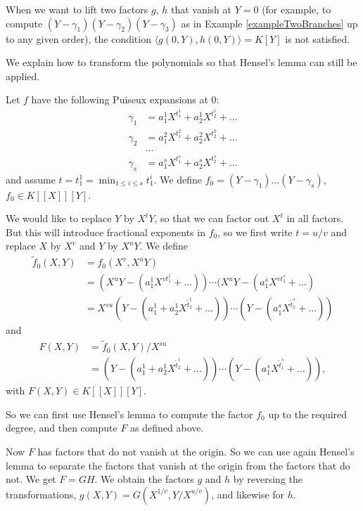 \documentclass[a4paper,11pt]{amsart}%
\theoremstyle{definition}
\theoremstyle{plain}
\theoremstyle{remark}
\begin{document}
When we want to lift two factors $g$, $h$ that vanish at $Y = 0$ (for example,
to compute $(Y-\gamma_{1})(Y-\gamma_{2})(Y-\gamma_{3})$ as in Example
\ref{exampleTwoBranches} up to any given order), the condition $\langle g(0,
Y), h(0,Y)\rangle= K[Y]$ is not satisfied.

We explain how to transform the polynomials so that Hensel's lemma can still
be applied.

Let $f$ have the following Puiseux expansions at $0$:
\begin{align*}
\gamma_{1}  &  = a_{1}^{1} X^{t_{1}^{1}} + a_{2}^{1} X^{t_{2}^{1}} + \dots\\
\gamma_{2}  &  = a_{1}^{2} X^{t_{1}^{2}} + a_{2}^{2} X^{t_{2}^{2}} + \dots\\
&  \dots\\
\gamma_{s}  &  = a_{1}^{s} X^{t_{1}^{s}} + a_{2}^{s} X^{t_{2}^{s}} + \dots
\end{align*}
and assume $t = t_{1}^{1} = \min_{1 \leq i \leq s}t_{1}^{i}$. We define $f_{0}
= (Y-\gamma_{1}) \dots(Y-\gamma_{s})$, $f_{0} \in K[[X]][Y]$.

We would like to replace $Y$ by $X^{t}Y$, so that we can factor out $X^{t}$ in
all factors. But this will introduce fractional exponents in $f_{0}$, so we
first write $t = u/v$ and replace $X$ by $X^{v}$ and $Y$ by $X^{u}Y$. We
define
\begin{align*}
\tilde f_{0}(X, Y)  &  = f_{0}(X^{v}, X^{u}Y)\\
&  = (X^{u} Y - (a_{1}^{1} X^{vt_{1}^{1}} + \dots)) \cdots(X^{u} Y -
(a_{1}^{s} X^{vt_{1}^{s}} + \dots)\\
&  = X^{su}(Y - (a_{1}^{1} + a_{2}^{1} X^{\tilde t_{2}^{1}} + \dots))\cdots(Y
- (a_{1}^{s} X^{\tilde t_{1}^{s}} + \dots))
\end{align*}
and
\begin{align*}
F(X, Y)  &  = \tilde f_{0}(X, Y) / X^{su}\\
&  = (Y - (a_{1}^{1} + a_{2}^{1} X^{\tilde t_{2}^{1}} + \dots))\cdots(Y -
(a_{1}^{s} X^{\tilde t_{1}^{s}} + \dots)),
\end{align*}
with $F(X, Y) \in K[[X]][Y]$.

So we can first use Hensel's lemma to compute the factor $f_{0}$ up to the
required degree, and then compute $F$ as defined above.

Now $F$ has factors that do not vanish at the origin. So we can use again
Hensel's lemma to separate the factors that vanish at the origin from the
factors that do not. We get $F=GH$. We obtain the factors $g$ and $h$ by
reversing the transformations, $g(X,Y)=G(X^{1/v},Y/X^{u/v})$, and likewise for
$h$.
\end{document}

